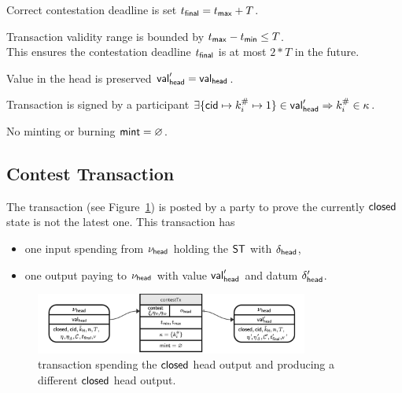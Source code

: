 \begin{menumerate}
	\item Correct contestation deadline is set $t_{\mathsf{final}} = t_{\mathsf{max}} + T$.
	\item Transaction validity range is bounded by
	$t_{\mathsf{max}} - t_{\mathsf{min}} \leq T$. \\
	This ensures the contestation deadline $t_{\mathsf{final}}$ is at most $2*T$ in the future.
	\item Value in the head is preserved $\mathsf{val}_{\mathsf{head}}' = \mathsf{val}_{\mathsf{head}}$.
	\item Transaction is signed by a participant $\exists \{\mathsf{cid} \mapsto k^{\#}_{i} \mapsto 1\} \in \mathsf{val}_{\mathsf{head}}' \Rightarrow k^{\#}_{i} \in \kappa$.
	\item No minting or burning $\mathsf{mint} = \varnothing$.
\end{menumerate}

\subsection{Contest Transaction}\label{sec:contest-tx}

The \mtxContest{} transaction (see Figure~\ref{fig:contestTx}) is posted by a
party to prove the currently $\mathsf{closed}$ state is not the latest one. This
transaction has
\begin{itemize}
	\item one input spending from $\nu_\mathsf{head}$ holding the $\mathsf{ST}$ with $\delta_{\mathsf{head}}$,
	\item one output paying to $\nu_\mathsf{head}$ with value $\mathsf{val}_{\mathsf{head}}'$ and
	      datum $\delta_{\mathsf{head}}'$.
\end{itemize}

\begin{figure}
	\centering \includegraphics[width=0.8\textwidth]{figures/contestTx.pdf}
	\caption{\mtxContest{} transaction spending the $\mathsf{closed}$ head output and
		producing a different $\mathsf{closed}$ head output.}\label{fig:contestTx}
\end{figure}

